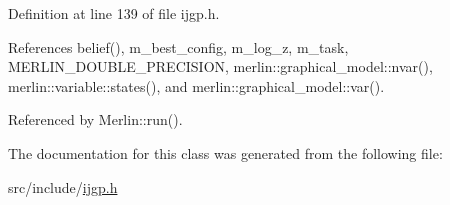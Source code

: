 Definition at line 139 of file ijgp.\+h.



References belief(), m\+\_\+best\+\_\+config, m\+\_\+log\+\_\+z, m\+\_\+task, M\+E\+R\+L\+I\+N\+\_\+\+D\+O\+U\+B\+L\+E\+\_\+\+P\+R\+E\+C\+I\+S\+I\+ON, merlin\+::graphical\+\_\+model\+::nvar(), merlin\+::variable\+::states(), and merlin\+::graphical\+\_\+model\+::var().



Referenced by Merlin\+::run().



The documentation for this class was generated from the following file\+:\begin{DoxyCompactItemize}
\item 
src/include/\hyperlink{ijgp_8h}{ijgp.\+h}\end{DoxyCompactItemize}
